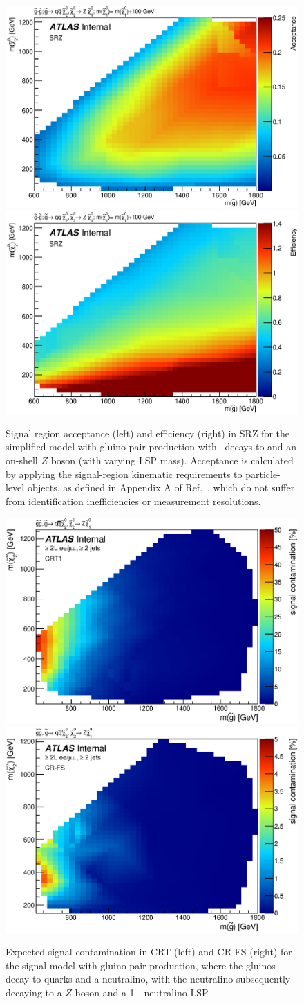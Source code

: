 \begin{figure}[ht]
\centering
\includegraphics[width=.48\textwidth]{figures/signalacceptcontam/acc_SM_GG_N2.eps}
\includegraphics[width=.48\textwidth]{figures/signalacceptcontam/eff_SM_GG_N2.eps}
\caption{
Signal region acceptance (left) and efficiency (right) in SRZ for the simplified model with gluino pair production with \chitwozero\ decays to \chionezero and an on-shell $Z$ boson (with varying LSP mass).  
Acceptance is calculated by applying the signal-region kinematic requirements to particle-level objects, as defined in Appendix A of Ref.~\cite{SUSY-2013-19}, which do not suffer from identification inefficiencies or measurement resolutions.
}
\label{fig:acc_SMGGN2_z}
\end{figure}

\begin{figure}[ht]
\centering
\includegraphics[width=.48\textwidth]{figures/signalacceptcontam/cont_SM_GG_N2_1_CRT1.eps}
\includegraphics[width=.48\textwidth]{figures/signalacceptcontam/cont_SM_GG_N2_1_CR-FS.eps}
\caption{
Expected signal contamination in CRT (left) and CR-FS (right) for the signal model with gluino pair production, where the gluinos decay to quarks and a neutralino, 
with the neutralino subsequently decaying to a $Z$ boson and a 1~\GeV\ neutralino LSP.}
\label{fig:sig_contam_CRT}
\end{figure}


